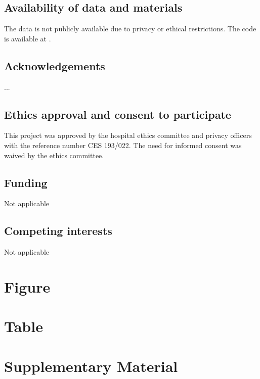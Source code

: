 \documentclass[fleqn,10pt,lineno]{manuscript}
\newcommand{\beginsupplement}{%
        \setcounter{table}{0}
        \renewcommand{\thetable}{S\arabic{table}}%
        \setcounter{figure}{0}
        \renewcommand{\thefigure}{S\arabic{figure}}%
     }
\begin{document}
\subsection*{Availability of data and materials}

The data is not publicly available due to privacy or ethical restrictions. The code is available at \url{}.

\subsection*{Acknowledgements}

...

\subsection*{Ethics approval and consent to participate}

This project was approved by the hospital ethics committee and privacy officers with the reference number CES 193/022. The need for informed consent was waived by the ethics committee.

\subsection*{Funding}

Not applicable

\subsection*{Competing interests}

Not applicable







\section*{Figure}


\section*{Table}


\clearpage

\beginsupplement
\renewcommand\figurename{Supplementary Figure}
\renewcommand\tablename{Supplementary Table}


\section*{Supplementary Material}
\end{document}
